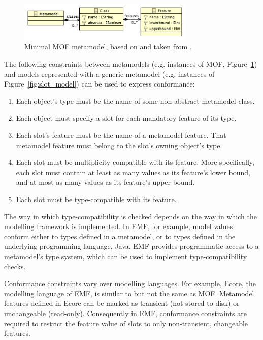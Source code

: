 \begin{figure}[htbp]
  \centering
  \includegraphics[width=3.3in]{5.Implementation/mof.pdf}
  \caption[Minimal MOF metamodel]{Minimal MOF metamodel, based on \cite{mof} and taken from \cite{rose09enhanced}.}
  \label{fig:minimal_mof}
\end{figure}

The following constraints between metamodels (e.g. instances of MOF, Figure~\ref{fig:minimal_mof}) and models represented with a generic metamodel (e.g. instances of Figure~\ref{fig:slot_model}) can be used to express conformance:

\begin{enumerate}
	\item Each object's type must be the name of some non-abstract metamodel class.
	\item Each object must specify a slot for each mandatory feature of its type.
	\item Each slot's feature must be the name of a metamodel feature. That metamodel feature must belong to the slot's owning object's type.
	\item Each slot must be multiplicity-compatible with its feature. More specifically, each slot must contain at least as many values as its feature's lower bound, and at most as many values as its feature's upper bound.
  \item Each slot must be type-compatible with its feature.
\end{enumerate}


The way in which type-compatibility is checked depends on the way in which the modelling framework is implemented. In EMF, for example, model values conform either to types defined in a metamodel, or to types defined in the underlying programming language, Java. EMF provides programmatic access to a metamodel's type system, which can be used to implement type-compatibility checks.

Conformance constraints vary over modelling languages. For example, Ecore, the modelling language of EMF, is similar to but not the same as MOF. Metamodel features defined in Ecore can be marked as transient (not stored to disk) or unchangeable (read-only). Consequently in EMF, conformance constraints are required to restrict the feature value of slots to only non-transient, changeable features.


